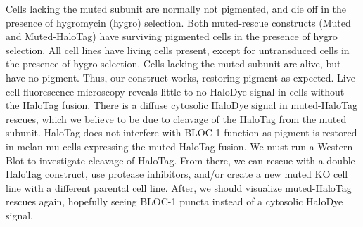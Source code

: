     {
    Cells lacking the muted subunit are normally not pigmented, and die off in the presence of hygromycin (hygro) selection. Both muted-rescue constructs (Muted and Muted-HaloTag) have surviving pigmented cells in the presence of hygro selection. All cell lines have living cells present, except for untransduced cells in the presence of hygro selection. Cells lacking the muted subunit are alive, but have no pigment. Thus, our construct works, restoring pigment as expected. Live cell fluorescence microscopy reveals little to no HaloDye signal in cells without the HaloTag fusion. There is a diffuse cytosolic HaloDye signal in muted-HaloTag rescues, which we believe to be due to cleavage of the HaloTag from the muted subunit.
    }
    {
    HaloTag does not interfere with BLOC-1 function as pigment is restored in melan-mu cells expressing the muted HaloTag fusion. We must run a Western Blot to investigate cleavage of HaloTag. From there, we can rescue with a double HaloTag construct, use protease inhibitors, and/or create a new muted KO cell line with a different parental cell line. After, we should visualize muted-HaloTag rescues again, hopefully seeing BLOC-1 puncta instead of a cytosolic HaloDye signal.
    }

    \newpage
    